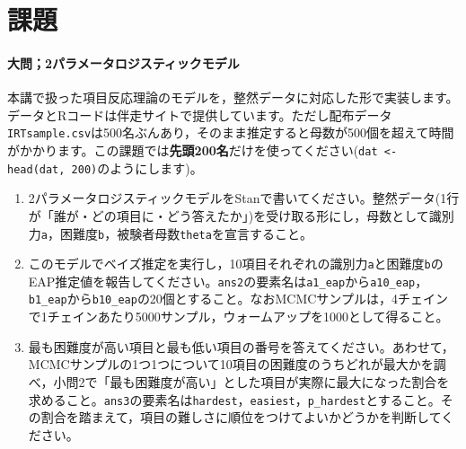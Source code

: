 \documentclass{ltjsbook}
\begin{document}
\section{課題}


\paragraph{大問；2パラメータロジスティックモデル}
本講で扱った項目反応理論のモデルを，整然データに対応した形で実装します。データとRコードは伴走サイトで提供しています。ただし配布データ\texttt{IRTsample.csv}は500名ぶんあり，そのまま推定すると母数が500個を超えて時間がかかります。この課題では\textbf{先頭200名}だけを使ってください(\verb|dat <- head(dat, 200)|のようにします)。
\begin{enumerate}
	\item 2パラメータロジスティックモデルをStanで書いてください。整然データ(1行が「誰が・どの項目に・どう答えたか」)を受け取る形にし，母数として識別力\verb|a|，困難度\verb|b|，被験者母数\verb|theta|を宣言すること。
	\item このモデルでベイズ推定を実行し，10項目それぞれの識別力\verb|a|と困難度\verb|b|のEAP推定値を報告してください。\verb|ans2|の要素名は\verb|a1_eap|から\verb|a10_eap|，\verb|b1_eap|から\verb|b10_eap|の20個とすること。なおMCMCサンプルは，4チェインで1チェインあたり5000サンプル，ウォームアップを1000として得ること。
	\item 最も困難度が高い項目と最も低い項目の番号を答えてください。あわせて，MCMCサンプルの1つ1つについて10項目の困難度のうちどれが最大かを調べ，小問2で「最も困難度が高い」とした項目が実際に最大になった割合を求めること。\verb|ans3|の要素名は\verb|hardest|，\verb|easiest|，\verb|p_hardest|とすること。その割合を踏まえて，項目の難しさに順位をつけてよいかどうかを判断してください。
\end{enumerate}
\end{document}

